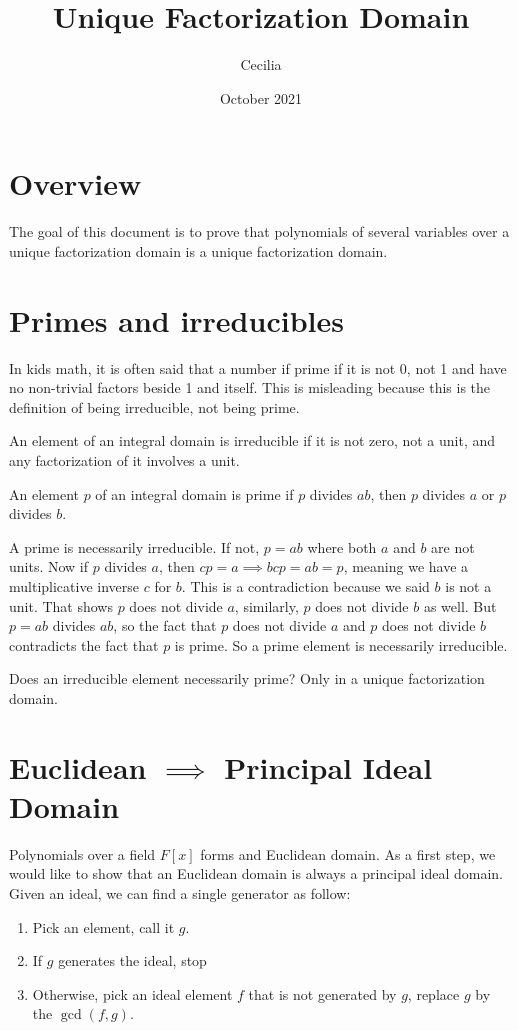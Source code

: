 \documentclass{article}
\title{Unique Factorization Domain}
\author{Cecilia}
\date{October 2021}
\begin{document}
\maketitle
\section*{Overview}
The goal of this document is to prove that polynomials of several variables over a unique factorization domain is a unique factorization domain.

\section{Primes and irreducibles}
In kids math, it is often said that a number if prime if it is not 0, not 1 and have no non-trivial factors beside 1 and itself. This is misleading because this is the definition of being irreducible, not being prime.

An element of an integral domain is irreducible if it is not zero, not a unit, and any factorization of it involves a unit.

An element $ p $ of an integral domain is prime if $ p $ divides $ ab $, then $ p $ divides $ a $ or $ p $ divides $ b $.

A prime is necessarily irreducible. If not, $ p = ab $ where both $ a $ and $ b $ are not units. Now if $ p $ divides $ a $, then $ cp = a \implies bcp = ab = p $, meaning we have a multiplicative inverse $ c $ for $ b $. This is a contradiction because we said $ b $ is not a unit. That shows $ p $ does not divide $ a $, similarly, $ p $ does not divide $ b $ as well. But $ p = ab $ divides $ ab $, so the fact that $ p $ does not divide $ a $ and $ p $ does not divide $ b $ contradicts the fact that $ p $ is prime. So a prime element is necessarily irreducible.

Does an irreducible element necessarily prime? Only in a unique factorization domain.

\section{Euclidean $ \implies $ Principal Ideal Domain}
Polynomials over a field $ F[x] $ forms and Euclidean domain. As a first step, we would like to show that an Euclidean domain is always a principal ideal domain. Given an ideal, we can find a single generator as follow:

\begin{enumerate}
    \item Pick an element, call it $ g $.
    \item If $ g $ generates the ideal, stop
    \item Otherwise, pick an ideal element $ f $ that is not generated by $ g $, replace $ g $ by the $ \gcd(f, g) $. 
\end{enumerate}
\end{document}
